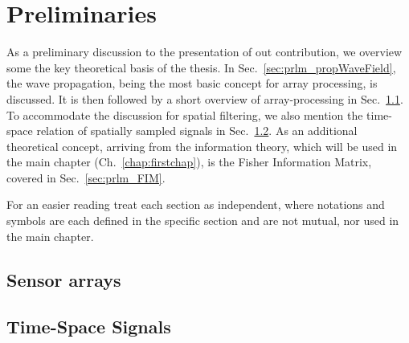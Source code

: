 \chapter{Preliminaries}
\label{chap:prelims}

As a preliminary discussion to the presentation of out contribution, we overview some the key theoretical basis of the thesis.
In Sec.~\ref{sec:prlm_propWaveField}, the wave propagation, being the most basic concept for array processing, is discussed.
It is then followed by a short overview of array-processing in Sec.~\ref{sec:prlm_sensorArrays}.
To accommodate the discussion for spatial filtering, we also mention the time-space relation of spatially sampled signals in Sec.~\ref{sec:prlm_timeSpaceSig}.
As an additional theoretical concept, arriving from the information theory, which will be used in the main chapter (Ch.~\ref{chap:firstchap}), is the Fisher Information Matrix, covered in Sec.~\ref{sec:prlm_FIM}.
\par 
For an easier reading treat each section as independent, where notations and symbols are each defined in the specific section and are not mutual, nor used in the main chapter. 


% 
% 
\section{Sensor arrays}
\label{sec:prlm_sensorArrays}

\section{Time-Space Signals}
\label{sec:prlm_timeSpaceSig}

% 
% 